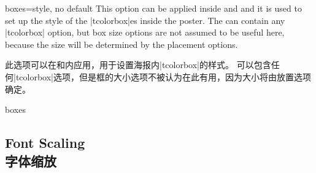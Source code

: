 \begin{postersetTcbKey}[][doc new=2017-07-03]{boxes}{=}{style, no default}
This option can be applied inside  and 
and it is used to set up the style of the |tcolorbox|es inside the poster.
The  can contain any |tcolorbox| option, but box size
options are not assumed to be useful here, because the size will be
determined by the placement options.

此选项可以在和内应用，用于设置海报内|tcolorbox|的样式。 可以包含任何|tcolorbox|选项，但是框的大小选项不被认为在此有用，因为大小将由放置选项确定。
\begin{exdispExample}{boxes}
\begin{tcbposter}[
  poster   = {spacing=2mm,columns=3,rows=2},
  coverage = {height=5cm,
              interior style={top color=yellow,bottom color=yellow!50!red},
             },
  boxes    = {sharp corners=downhill,arc=3mm,boxrule=1mm,
              colback=white,colframe=cyan,
              title style={left color=black,right color=cyan},
              fonttitle=\bfseries}
]
\end{tcbposter}
\end{exdispExample}

\end{postersetTcbKey}


\subsection{Font Scaling\\字体缩放}\label{subsec:poster_fontsize}

